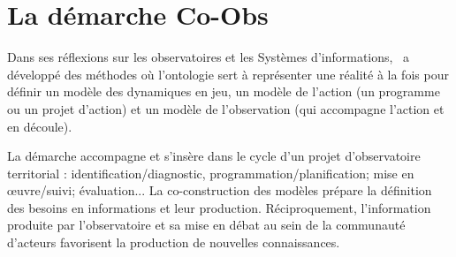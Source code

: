 \section{La démarche Co-Obs}

\startplacefigure[location=middle,title={La démarche Co-Obs}]
\stopplacefigure

Dans ses réflexions sur les observatoires et les Systèmes d'informations,
\TETIS\ a développé des méthodes où l'ontologie sert à représenter une réalité
à la fois pour définir un modèle des dynamiques en jeu,
un modèle de l'action (un programme ou un projet d'action)
et un modèle de l'observation (qui accompagne l'action et en découle). 

La démarche accompagne et s'insère dans le cycle d'un projet d'observatoire territorial :
identification/diagnostic, programmation/planification; mise en œuvre/suivi; évaluation... 
La co-construction des modèles prépare la définition des besoins en informations et leur production.
Réciproquement, l’information produite par l’observatoire et sa mise en débat au sein de la communauté 
d’acteurs favorisent la production de nouvelles connaissances.